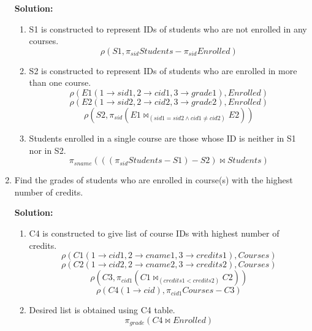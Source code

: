 \begin{enumerate}
  \textbf{Solution:}
  \begin{enumerate}
  \item{S1 is constructed to represent IDs of students who are not enrolled in any courses.}
  $$\displaystyle \rho(S1, \pi_{sid}Students-\pi_{sid}Enrolled)$$
  \item{S2 is constructed to represent IDs of students who are enrolled in more than one course.}
  $$\displaystyle \rho(E1(1\rightarrow sid1, 2\rightarrow cid1, 3\rightarrow grade1),Enrolled)$$
  $$\rho(E2(1\rightarrow sid2, 2\rightarrow cid2, 3\rightarrow grade2),Enrolled)$$  
  $$\rho(S2,\pi_{sid}(E1 \Join_{(sid1=sid2\wedge cid1\neq cid2)} E2) ) $$
  \item{Students enrolled in a single course are those whose ID is neither in S1 nor in S2.}
  $$\displaystyle \pi_{sname}( ((\pi_{sid}Students-S1)-S2)\Join Students)$$
  \end{enumerate}
  
  \item Find the grades of students who are enrolled in course(s) with the highest number of credits.
  
  \textbf{Solution:}
  \begin{enumerate}
  \item C4 is constructed to give list of course IDs with highest number of credits.
  $$\displaystyle \rho(C1(1\rightarrow cid1, 2\rightarrow cname1, 3\rightarrow credits1),Courses)$$
  $$\rho(C2(1\rightarrow cid2, 2\rightarrow cname2, 3\rightarrow credits2),Courses)$$
  $$\rho(C3,\pi_{cid1}(C1 \Join_{(credits1<credits2)} C2)) $$
  $$\rho(C4(1 \rightarrow cid),\pi_{cid1}Courses-C3)$$
  \item Desired list is obtained using C4 table.
  $$ \pi_{grade}(C4 \Join Enrolled) $$
  \end{enumerate}
  
\end{enumerate}

